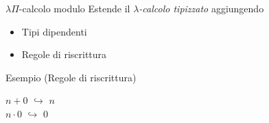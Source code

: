 \documentclass{beamer}
\begin{document}
\begin{frame}{$\lambda\Pi$-calcolo modulo}
  Estende il \textit{$\lambda$-calcolo tipizzato} aggiungendo
\begin{itemize}
  \vspace{1em}
  \item Tipi dipendenti 
  \vspace{1em}
  \item Regole di riscrittura
\end{itemize}
\pause
\begin{exampleblock}{Esempio (Regole di riscrittura)}
\begin{center}
  $n+0$ $\hookrightarrow$ $n$ \\
  \vspace{1em}
  $n \cdot 0$ $\hookrightarrow$ $0$
\end{center}
\end{exampleblock}
\end{frame}
\end{document}

